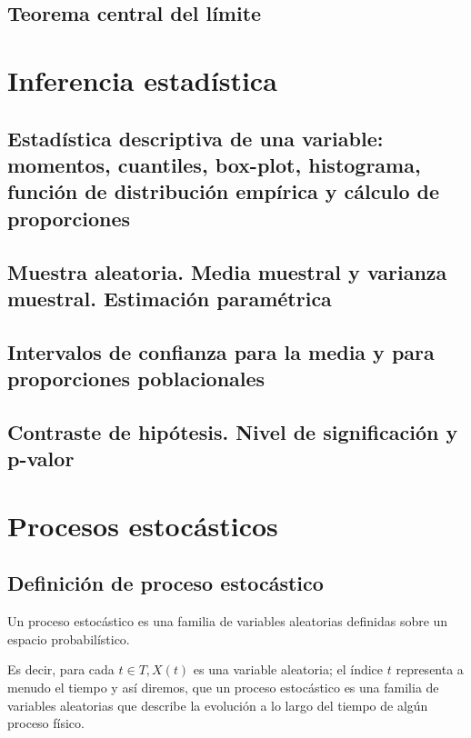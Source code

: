 \documentclass[a4paper]{book}
\numberwithin{figure}{section}
\numberwithin{equation}{subsection}
\numberwithin{figure}{chapter}
\theoremstyle{definition}
\begin{document}
\section{Teorema central del límite}




\chapter{Inferencia estadística}


\section{Estadística descriptiva de una variable: momentos, cuantiles, box-plot, histograma, función de distribución empírica y cálculo de proporciones}

\section{Muestra aleatoria. Media muestral y varianza muestral. Estimación paramétrica}

\section{Intervalos de confianza para la media y para proporciones poblacionales}

\section{Contraste de hipótesis. Nivel de significación y p-valor}



\chapter{Procesos estocásticos}

\section{Definición de proceso estocástico}
Un proceso estocástico es una familia de variables aleatorias definidas sobre un espacio probabilístico.

Es decir, para cada $ t\in T, X(t)$ es una variable aleatoria; el índice $t$ representa a menudo el tiempo y así diremos, que un proceso estocástico es una familia de variables aleatorias que describe la evolución a lo largo del tiempo de algún proceso físico.
\end{document}
